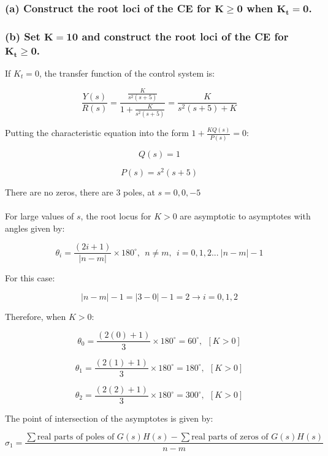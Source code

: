 \documentclass[12pt, letterpaper]{../assignment}
\begin{document}
\subsubsection*{(a) Construct the root loci of the CE for $\mathbf{K \ge 0}$ when $\mathbf{K_t=0}$.}
\subsubsection*{(b) Set $\mathbf{K=10}$ and construct the root loci of the CE for $\mathbf{K_t \ge 0}$.}

If $K_t = 0$, the transfer function of the control system is:

$$ \frac{Y(s)}{R(s)} = \frac{\frac{K}{s^2 (s+5)}}{1 + \frac{K}{s^2 (s+5)}} = \frac{K}{s^2 (s+5) + K} $$

Putting the characteristic equation into the form $ 1 + \frac{K Q(s)}{P(s)} = 0 $:

$$ Q(s) = 1 $$

$$ P(s) = s^2 (s+5) $$

There are no zeros, there are 3 poles, at $s = 0, 0, -5$
\\\\
For large values of $s$, the root locus for $K > 0$ are asymptotic to asymptotes with angles
given by:

$$ \theta_i = \frac{(2i+1)}{|n-m|} \times 180^{\circ}, \ \ n \neq m, \ \ i = 0,1,2... \ |n-m|-1$$

For this case:

$$ |n-m|-1 = |3-0|-1 = 2 \rightarrow i = 0,1,2 $$

Therefore, when $K > 0$:
\begin{answer}
    $$ \theta_0 = \frac{(2(0)+1)}{3} \times 180^{\circ} = 60^{\circ}, \ \ [K > 0] $$
\end{answer}


\begin{answer}
    $$ \theta_1 = \frac{(2(1)+1)}{3} \times 180^{\circ} = 180^{\circ}, \ \ [K > 0] $$
\end{answer}


\begin{answer}
    $$ \theta_2 = \frac{(2(2)+1)}{3} \times 180^{\circ} = 300^{\circ}, \ \ [K > 0] $$
\end{answer}

The point of intersection of the asymptotes is given by:

$$ \sigma_1 = \frac{\sum \text{real parts of poles of } G(s)H(s) - \sum \text{real parts of zeros of } G(s)H(s) }{n-m} $$
\end{document}
